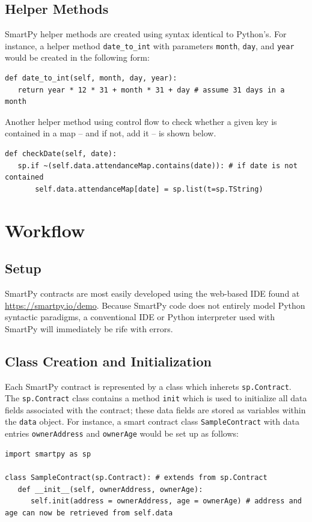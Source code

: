 \documentclass{article}
\begin{document}
\subsection{Helper Methods}
SmartPy helper methods are created using syntax identical to Python's. For instance, a helper method \lstinline!date_to_int! with parameters \lstinline!month!, \lstinline!day!, and \lstinline!year! would be created in the following form:
\begin{lstlisting}
def date_to_int(self, month, day, year):
   return year * 12 * 31 + month * 31 + day # assume 31 days in a month
\end{lstlisting}
Another helper method using control flow to check whether a given key is contained in a map -- and if not, add it -- is shown below.
\begin{lstlisting}
def checkDate(self, date):
   sp.if ~(self.data.attendanceMap.contains(date)): # if date is not contained
       self.data.attendanceMap[date] = sp.list(t=sp.TString)
\end{lstlisting}
\section{Workflow}
\subsection{Setup}
SmartPy contracts are most easily developed using the web-based IDE found at \url{https://smartpy.io/demo}. Because SmartPy code does not entirely model Python syntactic paradigms, a conventional IDE or Python interpreter used with SmartPy will immediately be rife with errors.
\subsection{Class Creation and Initialization}
Each SmartPy contract is represented by a class which inherets \lstinline!sp.Contract!. The \lstinline!sp.Contract! class contains a method \lstinline!init! which is used to initialize all data fields associated with the contract; these data fields are stored as variables within the \lstinline!data! object. For instance, a smart contract class \lstinline!SampleContract! with data entries \lstinline!ownerAddress! and \lstinline!ownerAge! would be set up as follows:
\begin{lstlisting}
import smartpy as sp

class SampleContract(sp.Contract): # extends from sp.Contract
   def __init__(self, ownerAddress, ownerAge):
      self.init(address = ownerAddress, age = ownerAge) # address and age can now be retrieved from self.data
\end{lstlisting}
\end{document}
